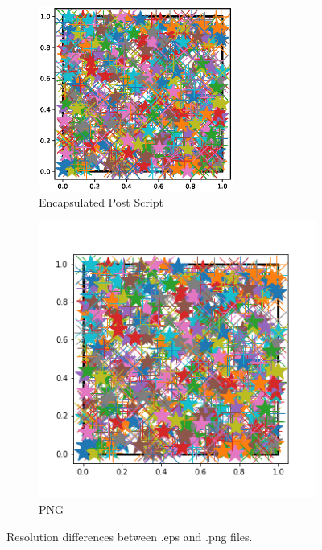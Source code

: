 \documentclass[final,oneside,onecolumn]{article}
\begin{document}
\begin{figure}
	\begin{subfigure}[b]{\textwidth}
		\centering
		\includegraphics[width=0.7\textwidth]{test.eps}
		\caption{Encapsulated Post Script}
		\label{fig:eps}
	\end{subfigure}
	\hfill
	\begin{subfigure}[b]{\textwidth}
			\centering
			\includegraphics[width=.7\textwidth]{test.png}
			\caption{PNG}
			\label{fig:png}
		\end{subfigure}
	\caption{Resolution differences between .eps and .png files.}
	\label{fig:formats}
\end{figure}
\end{document}
